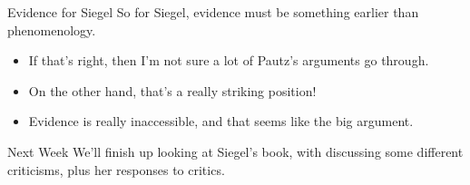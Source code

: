 \documentclass[
  17pt,
  letterpaper,
  ignorenonframetext,
  aspectratio=169,
  xcolor={dvipsnames}]{beamer}
\providecommand{\tightlist}{%
  \setlength{\itemsep}{0pt}\setlength{\parskip}{0pt}}\usepackage{longtable,booktabs,array}
\begin{document}
\begin{frame}{Evidence for Siegel}
\protect\hypertarget{evidence-for-siegel-1}{}
So for Siegel, evidence must be something earlier than phenomenology.

\begin{itemize}[<+->]
\tightlist
\item
  If that's right, then I'm not sure a lot of Pautz's arguments go
  through.
\item
  On the other hand, that's a really striking position!
\item
  Evidence is really inaccessible, and that seems like the big argument.
\end{itemize}
\end{frame}

\begin{frame}{Next Week}
\protect\hypertarget{next-week}{}
We'll finish up looking at Siegel's book, with discussing some different
criticisms, plus her responses to critics.
\end{frame}
\end{document}
